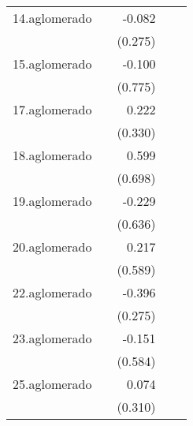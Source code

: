 {\begin{longtable}{l*{4}{D{.}{.}{-1}}}
\addlinespace
14.aglomerado&                     &      -0.082         &                     &                     \\
            &                     &     (0.275)         &                     &                     \\
\addlinespace
15.aglomerado&                     &      -0.100         &                     &                     \\
            &                     &     (0.775)         &                     &                     \\
\addlinespace
17.aglomerado&                     &       0.222         &                     &                     \\
            &                     &     (0.330)         &                     &                     \\
\addlinespace
18.aglomerado&                     &       0.599         &                     &                     \\
            &                     &     (0.698)         &                     &                     \\
\addlinespace
19.aglomerado&                     &      -0.229         &                     &                     \\
            &                     &     (0.636)         &                     &                     \\
\addlinespace
20.aglomerado&                     &       0.217         &                     &                     \\
            &                     &     (0.589)         &                     &                     \\
\addlinespace
22.aglomerado&                     &      -0.396         &                     &                     \\
            &                     &     (0.275)         &                     &                     \\
\addlinespace
23.aglomerado&                     &      -0.151         &                     &                     \\
            &                     &     (0.584)         &                     &                     \\
\addlinespace
25.aglomerado&                     &       0.074         &                     &                     \\
            &                     &     (0.310)         &                     &                     \\

\end{longtable}}
